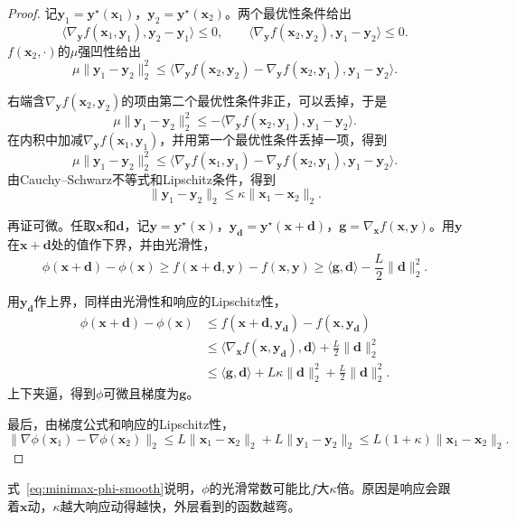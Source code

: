 \begin{proof}
记$\bm{y}_1=\bm{y}^\star(\bm{x}_1)$，$\bm{y}_2=\bm{y}^\star(\bm{x}_2)$。两个最优性条件给出
\[
 \langle\nabla_{\bm{y}}f(\bm{x}_1,\bm{y}_1),\bm{y}_2-\bm{y}_1\rangle\leq0,\qquad\langle\nabla_{\bm{y}}f(\bm{x}_2,\bm{y}_2),\bm{y}_1-\bm{y}_2\rangle\leq0.
\]
$f(\bm{x}_2,\cdot)$的$\mu$强凹性给出
\[
 \mu\lVert\bm{y}_1-\bm{y}_2\rVert_2^2\leq\langle\nabla_{\bm{y}}f(\bm{x}_2,\bm{y}_2)-\nabla_{\bm{y}}f(\bm{x}_2,\bm{y}_1),\bm{y}_1-\bm{y}_2\rangle.
\]

右端含$\nabla_{\bm{y}}f(\bm{x}_2,\bm{y}_2)$的项由第二个最优性条件非正，可以丢掉，于是
\[
 \mu\lVert\bm{y}_1-\bm{y}_2\rVert_2^2\leq-\langle\nabla_{\bm{y}}f(\bm{x}_2,\bm{y}_1),\bm{y}_1-\bm{y}_2\rangle.
\]
在内积中加减$\nabla_{\bm{y}}f(\bm{x}_1,\bm{y}_1)$，并用第一个最优性条件丢掉一项，得到
\[
 \mu\lVert\bm{y}_1-\bm{y}_2\rVert_2^2\leq\langle\nabla_{\bm{y}}f(\bm{x}_1,\bm{y}_1)-\nabla_{\bm{y}}f(\bm{x}_2,\bm{y}_1),\bm{y}_1-\bm{y}_2\rangle.
\]
由Cauchy--Schwarz不等式和Lipschitz条件，得到
\[
 \lVert\bm{y}_1-\bm{y}_2\rVert_2\leq\kappa\lVert\bm{x}_1-\bm{x}_2\rVert_2.
\]

再证可微。任取$\bm{x}$和$\bm{d}$，记$\bm{y}=\bm{y}^\star(\bm{x})$，$\bm{y}_{\bm{d}}=\bm{y}^\star(\bm{x}+\bm{d})$，$\bm{g}=\nabla_{\bm{x}}f(\bm{x},\bm{y})$。用$\bm{y}$在$\bm{x}+\bm{d}$处的值作下界，并由光滑性，
\[
 \phi(\bm{x}+\bm{d})-\phi(\bm{x})\geq f(\bm{x}+\bm{d},\bm{y})-f(\bm{x},\bm{y})\geq\langle\bm{g},\bm{d}\rangle-\frac{L}{2}\lVert\bm{d}\rVert_2^2.
\]

用$\bm{y}_{\bm{d}}$作上界，同样由光滑性和响应的Lipschitz性，
\[
 \begin{aligned}
 \phi(\bm{x}+\bm{d})-\phi(\bm{x})&\leq f(\bm{x}+\bm{d},\bm{y}_{\bm{d}})-f(\bm{x},\bm{y}_{\bm{d}})\\
 &\leq\langle\nabla_{\bm{x}}f(\bm{x},\bm{y}_{\bm{d}}),\bm{d}\rangle+\frac{L}{2}\lVert\bm{d}\rVert_2^2\\
 &\leq\langle\bm{g},\bm{d}\rangle+L\kappa\lVert\bm{d}\rVert_2^2+\frac{L}{2}\lVert\bm{d}\rVert_2^2.
 \end{aligned}
\]
上下夹逼，得到$\phi$可微且梯度为$\bm{g}$。

最后，由梯度公式和响应的Lipschitz性，
\[
 \lVert\nabla\phi(\bm{x}_1)-\nabla\phi(\bm{x}_2)\rVert_2\leq L\lVert\bm{x}_1-\bm{x}_2\rVert_2+L\lVert\bm{y}_1-\bm{y}_2\rVert_2\leq L(1+\kappa)\lVert\bm{x}_1-\bm{x}_2\rVert_2.
\]
\end{proof}

式~\eqref{eq:minimax-phi-smooth}说明，$\phi$的光滑常数可能比$f$大$\kappa$倍。原因是响应会跟着$\bm{x}$动，$\kappa$越大响应动得越快，外层看到的函数越弯。

